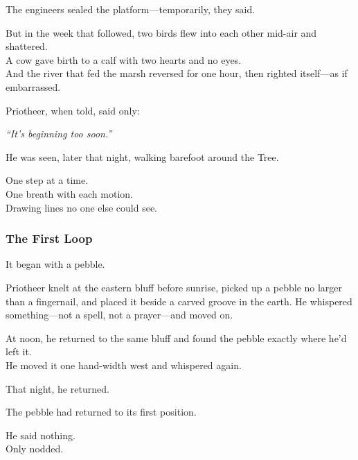 \documentclass[12pt]{article}
\begin{document}
\vspace{0.5em}
The engineers sealed the platform---temporarily, they said.

\vspace{0.5em}
But in the week that followed, two birds flew into each other mid-air and shattered.\\
A cow gave birth to a calf with two hearts and no eyes.\\
And the river that fed the marsh reversed for one hour, then righted itself---as if embarrassed.

\vspace{0.5em}
Priotheer, when told, said only:

\vspace{0.5em}
\textit{``It’s beginning too soon.''}

\vspace{0.5em}
He was seen, later that night, walking barefoot around the Tree.

\vspace{0.5em}
One step at a time.\\
One breath with each motion.\\
Drawing lines no one else could see.

\dotfill

\subsubsection*{The First Loop}

It began with a pebble.

\vspace{0.5em}
Priotheer knelt at the eastern bluff before sunrise, picked up a pebble no larger than a fingernail, and placed it beside a carved groove in the earth. He whispered something---not a spell, not a prayer---and moved on.

\vspace{0.5em}
At noon, he returned to the same bluff and found the pebble exactly where he’d left it.\\
He moved it one hand-width west and whispered again.

\vspace{0.5em}
That night, he returned.

\vspace{0.5em}
The pebble had returned to its first position.

\vspace{0.5em}
He said nothing.\\
Only nodded.
\end{document}
